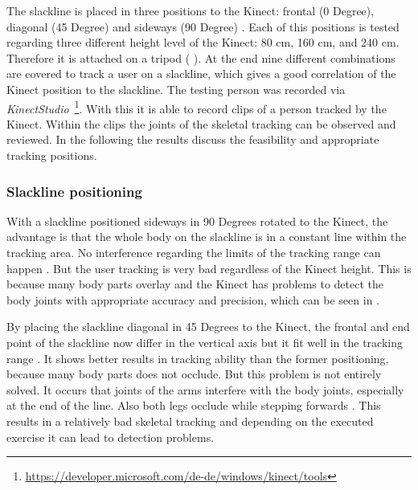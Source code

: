 The slackline is placed in three positions to the Kinect: frontal (0 Degree), diagonal (45 Degree) and sideways (90 Degree) \textbf{}. Each of this positions is tested regarding three different height level of the Kinect: 80 cm, 160 cm, and 240 cm. Therefore it is attached on a tripod ( \textbf{}). At the end nine different combinations are covered to track a user on a slackline, which gives a good correlation of the Kinect position to the slackline. The testing person was recorded via \textit{KinectStudio}~\footnote{\url{https://developer.microsoft.com/de-de/windows/kinect/tools}}. With this it is able to record clips of a person tracked by the Kinect.
Within the clips the joints of the skeletal tracking can be observed and reviewed. In the following the results discuss the feasibility and appropriate tracking positions.

\subsubsection{Slackline positioning}
With a slackline positioned sideways in 90 Degrees rotated to the Kinect, the advantage is that the whole body on the slackline is in a constant line within the tracking area. No interference regarding the limits of the tracking range can happen \textbf{}. But the user tracking is very bad regardless of the Kinect height. This is because many body parts overlay and the Kinect has problems to detect the body joints with appropriate accuracy and precision, which can be seen in \textbf{}.

By placing the slackline diagonal in 45 Degrees to the Kinect, the frontal and end point of the slackline now differ in the vertical axis but it fit well in the tracking range \textbf{}. 
It shows better results in tracking ability than the former positioning, because many body parts does not occlude. But this problem is not entirely solved. It occurs that joints of the arms interfere with the body joints, especially at the end of the line. Also both legs occlude while stepping forwards \textbf{}. This results in a relatively bad skeletal tracking and depending on the executed exercise it can lead to detection problems.

